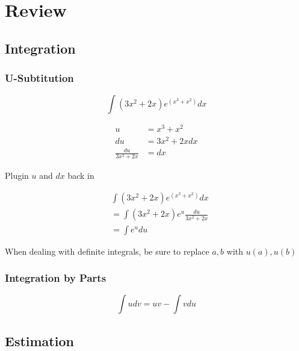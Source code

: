 \section{Review}

  \subsection{Integration}

    \subsubsection{U-Subtitution}

      \begin{displaymath}
        \int \left( 3x^{2} + 2x \right) e^{\left( x^{3} + x^{2} \right)} dx
      \end{displaymath}

      \begin{align*}
        u &= x^{3} + x^{2} \\
        du &= 3x^{2} + 2x dx \\
        \frac{du}{3x^{2} + 2x} &= dx
      \end{align*}

      Plugin $ u $ and $ dx $ back in

      \begin{align*}
        &\int \left( 3x^{2} + 2x \right) e^{\left( x^{3} + x^{2} \right)} dx \\
        &= \int \left( 3x^{2} + 2x \right) e^{u} \frac{du}{3x^{2} + 2x} \\
        &= \int e^{u} du
      \end{align*}

      When dealing with definite integrals, be sure to replace $ a, b $ with
      $ u\left( a \right), u\left( b \right) $

    \subsubsection{Integration by Parts}

      \begin{equation}
        \int u dv = uv - \int v du
      \end{equation}

  \subsection{Estimation}

